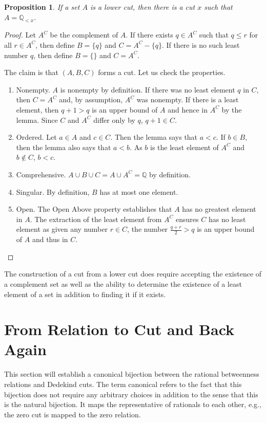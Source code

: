 \documentclass[12pt]{article}
\newtheorem{proposition}{Proposition}[section]
\newcommand{\qcut}[2][x]{\ensuremath{\mathbb{Q}_{#2 #1}}}
\newcommand{\qlt}[1][x]{\qcut[#1]{<}}
\begin{document}
\begin{proposition}
    If a set $A$ is a lower cut, then there is a cut $x$ such that $A = \qlt$.
\end{proposition}

\begin{proof}
    Let $A^C$ be the complement of $A$. If there exists $q \in A^C$ such that $q \leq r$ for all $r \in A^C$, then define $B = \{q\}$ and $C = A^C - \{q\}$. If there is no such least number $q$, then define $B = \{\}$ and $C = A^C$. 

    The claim is that $(A, B, C)$ forms a cut. Let us check the properties. 

    \begin{enumerate}
        \item Nonempty. $A$ is nonempty by definition. If there was no least element $q$ in $C$, then $C = A^C$ and, by assumption, $A^C$ was nonempty. If there is a least element, then $q+1 > q$ is an upper bound of $A$ and hence in $A^C$ by the lemma. Since $C$ and $A^C$ differ only by $q$, $q+1 \in C$. 
        \item Ordered. Let $a \in A$ and $c \in C$. Then the lemma says that $ a< c$. If $b \in B$, then the lemma also says that $a < b$. As $b$ is the least element of $A^C$ and $b \notin C$, $ b < c$. 
        \item Comprehensive. $A \cup B \cup C = A \cup A^C = \mathbb{Q}$ by definition. 
        \item Singular. By definition, $B$ has at most one element. 
        \item Open. The Open Above property establishes that $A$ has no greatest element in $A$. The extraction of the least element from $A^C$ ensures $C$ has no least element as given any number $r \in C$, the number $\frac{q+r}{2} > q$ is an upper bound of $A$ and thus in $C$. 
    \end{enumerate}
\end{proof}

The construction of a cut from a lower cut does require accepting the existence of a complement set as well as the ability to determine the existence of a least element of a set in addition to finding it if it exists. 

\section{From Relation to Cut and Back Again}

This section will establish a canonical bijection between the rational betweenness relations and Dedekind cuts. The term canonical refers to the fact that this bijection does not require any arbitrary choices in addition to the sense that this is the natural bijection. It maps the representative of rationals to each other, e.g., the zero cut is mapped to the zero relation. 
\end{document}
